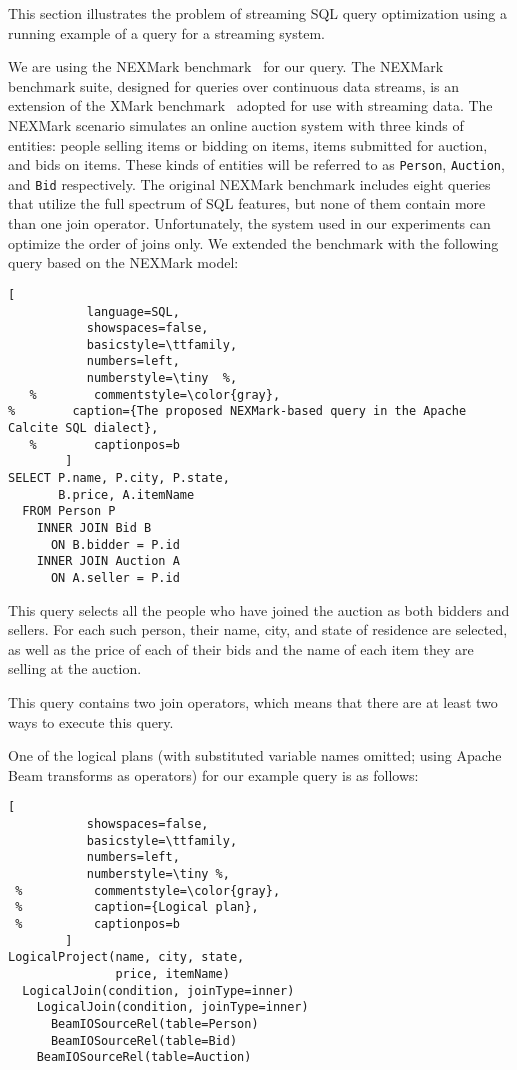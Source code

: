 \label {sec:fs-optimization-problem-statement}

This section illustrates the problem of streaming SQL query optimization using a running example of a query for a streaming system.

We are using the NEXMark benchmark~\cite{tucker2008nexmark} for our query. The NEXMark benchmark suite, designed for queries over continuous data streams, is an extension of the XMark benchmark~\cite{schmidt2002xmark} adopted for use with streaming data. 
The NEXMark scenario simulates an online auction system with three kinds of entities: people selling items or bidding on items, items submitted for auction, and bids on items. 
These kinds of entities will be referred to as \texttt{Person}, \texttt{Auction}, and \texttt{Bid} respectively. 
The original NEXMark benchmark includes eight queries that utilize the full spectrum of SQL features, but none of them contain more than one join operator.  Unfortunately, the system used in our experiments can optimize the order of joins only. 
We extended the benchmark with  the following query based on the NEXMark model:  



\begin{lstlisting}[
           language=SQL,
           showspaces=false,
           basicstyle=\ttfamily,
           numbers=left,
           numberstyle=\tiny  %,
   %        commentstyle=\color{gray},
%        caption={The proposed NEXMark-based query in the Apache Calcite SQL dialect}, 
   %        captionpos=b
        ]
SELECT P.name, P.city, P.state, 
       B.price, A.itemName 
  FROM Person P 
    INNER JOIN Bid B 
      ON B.bidder = P.id 
    INNER JOIN Auction A 
      ON A.seller = P.id
\end{lstlisting}

This query selects all the people who have joined the auction as both bidders and sellers. 
For each such person, their name, city, and state of residence are selected, as well as the price of each of their bids and the name of each item they are selling at the auction. 

This query contains two join operators, which means that there are at least two ways to execute this query.

One of the logical plans (with substituted variable names omitted; using Apache Beam transforms as operators) for our example query is as follows: 

\begin{lstlisting}[
           showspaces=false,
           basicstyle=\ttfamily,
           numbers=left,
           numberstyle=\tiny %,
 %          commentstyle=\color{gray},
 %          caption={Logical plan}, 
 %          captionpos=b
        ]
LogicalProject(name, city, state, 
               price, itemName)
  LogicalJoin(condition, joinType=inner) 
    LogicalJoin(condition, joinType=inner)
      BeamIOSourceRel(table=Person)
      BeamIOSourceRel(table=Bid)
    BeamIOSourceRel(table=Auction)
\end{lstlisting}

